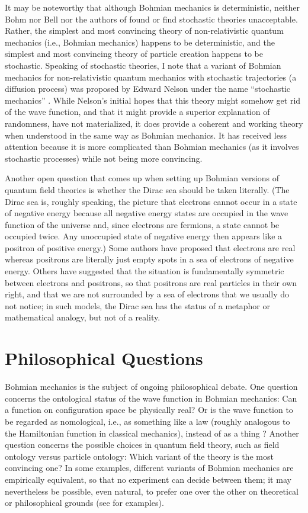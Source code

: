 \documentclass[12pt]{article}
\begin{document}
It may be noteworthy that although Bohmian mechanics is deterministic, neither Bohm nor Bell nor the authors of \cite{crlet} found or find stochastic theories unacceptable. Rather, the simplest and most convincing theory of non-relativistic quantum mechanics (i.e., Bohmian mechanics) happens to be deterministic, and the simplest and most convincing theory of particle creation happens to be stochastic. Speaking of stochastic theories, I note that a variant of Bohmian mechanics for non-relativistic quantum mechanics with stochastic trajectories (a diffusion process) was proposed by Edward Nelson under the name ``stochastic mechanics'' \cite{Nel85,Gol87}. While Nelson's initial hopes that this theory might somehow get rid of the wave function, and that it might provide a superior explanation of randomness, have not materialized, it does provide a coherent and working theory when understood in the same way as Bohmian mechanics. It has received less attention because it is more complicated than Bohmian mechanics (as it involves stochastic processes) while not being more convincing.

Another open question that comes up when setting up Bohmian versions of quantum field theories is whether the Dirac sea should be taken literally. (The Dirac sea is, roughly speaking, the picture that electrons cannot occur in a state of negative energy because all negative energy states are occupied in the wave function of the universe and, since electrons are fermions, a state cannot be occupied twice. Any unoccupied state of negative energy then appears like a positron of positive energy.) Some authors \cite{CS07,DEO16} have proposed that electrons are real whereas positrons are literally just empty spots in a sea of electrons of negative energy. Others \cite{crlet} have suggested that the situation is fundamentally symmetric between electrons and positrons, so that positrons are real particles in their own right, and that we are not surrounded by a sea of electrons that we usually do not notice; in such models, the Dirac sea has the status of a metaphor or mathematical analogy, but not of a reality.



\section{Philosophical Questions}

Bohmian mechanics is the subject of ongoing philosophical debate. One question concerns the ontological status of the wave function in Bohmian mechanics: Can a function on configuration space be physically real? Or is the wave function to be regarded as nomological, i.e., as something like a law (roughly analogous to the Hamiltonian function in classical mechanics), instead of as a thing \cite{GZ11}? Another question concerns the possible choices in quantum field theory, such as field ontology versus particle ontology: Which variant of the theory is the most convincing one? In some examples, different variants of Bohmian mechanics are empirically equivalent, so that no experiment can decide between them; it may nevertheless be possible, even natural, to prefer one over the other on theoretical or philosophical grounds (see \cite{aapr} for examples).
\end{document}
